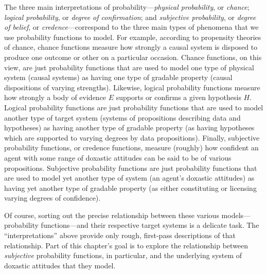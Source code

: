 The three main interpretations of probability---\emph{physical probability}, or \emph{chance}; \emph{logical probability}, or \emph{degree of confirmation}; and \emph{subjective probability}, or \emph{degree of belief}, or \emph{credence}---correspond to the three main types of phenomena that we use probability functions to model. For example, according to propensity theories of chance, chance functions measure how strongly a causal system is disposed to produce one outcome or other on a particular occasion. Chance functions, on this view, are just probability functions that are used to model one type of physical system (causal systems) as having one type of gradable property (causal dispositions of varying strengths). Likewise, logical probability functions measure how strongly a body of evidence $E$ supports or confirms a given hypothesis $H$. Logical probability functions are just probability functions that are used to model another type of target system (systems of propositions describing data and hypotheses) as having another type of gradable property (as having hypotheses which are supported to varying degrees by data propositions). Finally, subjective probability functions, or credence functions, measure (roughly) how confident an agent with some range of doxastic attitudes can be said to be of various propositions. Subjective probability functions are just probability functions that are used to model yet another type of system (an agent's doxastic attitudes) as having yet another type of gradable property (as either constituting or licensing varying degrees of confidence).

Of course, sorting out the precise relationship between these various models---probability functions---and their respective target systems is a delicate task. The ``interpretations'' above provide only rough, first-pass descriptions of that relationship. Part of this chapter's goal is to explore the relationship between \emph{subjective} probability functions, in particular, and the underlying system of doxastic attitudes that they model.

